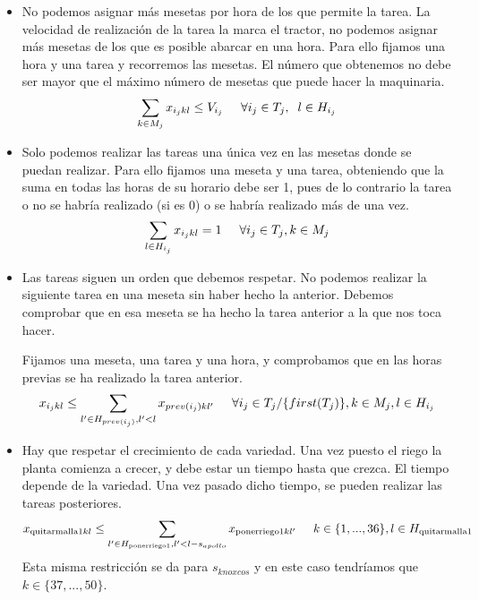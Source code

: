 \begin{itemize}
    \item  No podemos asignar más mesetas por hora de los que permite la tarea.
           La velocidad de realización de la tarea la marca el tractor, no podemos asignar más mesetas de los que es posible abarcar en una hora.
           Para ello fijamos una hora y una tarea y recorremos las mesetas. El número que obtenemos no debe ser mayor que el máximo número de mesetas que puede hacer la maquinaria. 
	    \[
            \sum_{k\in M_j}x_{i_j kl} \leq V_{i_j} \hspace{0.5cm} \forall i_j \in T_j, \hspace{0.2cm} l\in H_{i_j}
        \]
    \item  Solo podemos realizar las tareas una única vez en las mesetas donde se puedan realizar.
           Para ello fijamos una meseta y una tarea, obteniendo que la suma en todas las horas de su horario debe ser 1,
           pues de lo contrario la tarea o no se habría realizado (si es 0) o se habría realizado más de una vez. 
        \[
	        \sum_{l\in H_{i_j}}x_{i_j kl} =1 \hspace{0.5cm} \forall i_j \in T_j , k \in M_j
        \]
    \item Las tareas siguen un orden que debemos respetar.
          No podemos realizar la siguiente tarea en una meseta sin haber hecho la anterior.
          Debemos comprobar que en esa meseta se ha hecho la tarea anterior a la que nos toca hacer. 
	
	      Fijamos una meseta, una tarea y una hora, y comprobamos que en las horas previas se ha realizado la tarea anterior. 
        \[
	        x_{i_j kl} \leq \sum_{l' \in H_{prev(i_j)}, l'<l}x_{prev(i_j)kl'} \hspace{0.5cm} \forall i_j\in T_j/\{first(T_j)\}, k\in M_j, l \in H_{i_j}
        \]
	
    \item  Hay que respetar el crecimiento de cada variedad. Una vez puesto el riego la planta comienza a crecer,
           y debe estar un tiempo hasta que crezca. El tiempo depende de la variedad.
           Una vez pasado dicho tiempo, se pueden realizar las tareas posteriores.
        \[
	        x_{\text{quitarmalla}1 kl} \leq \sum_{l'\in H_{\text{ponerriego}1}, l'<l-s_{apollo}}x_{\text{ponerriego}1kl'} \hspace{0.5cm} k\in \{1, ..., 36\}, l\in H_{\text{quitarmalla}1}
        \]
	    Esta misma restricción se da para $s_{knoxcos}$ y en este caso tendríamos que $k \in \{37, ..., 50\}$. 
	

\end{itemize}
